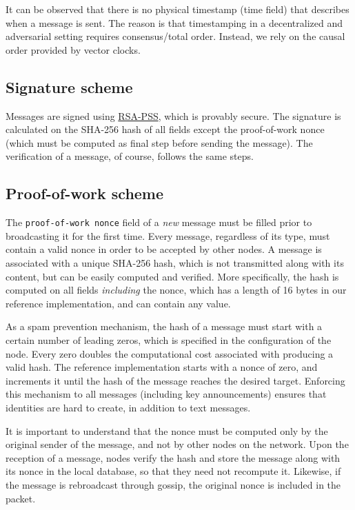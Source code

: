 \documentclass[a4paper,12pt]{article}
\begin{document}
It can be observed that there is no physical timestamp (time field) that describes when a message is sent. The reason is that timestamping in a decentralized and adversarial setting requires consensus/total order. Instead, we rely on the causal order provided by vector clocks.

\subsection*{Signature scheme}
Messages are signed using \href{https://en.wikipedia.org/wiki/Probabilistic\_signature\_scheme}{RSA-PSS}, which is provably secure. The signature is calculated on the SHA-256 hash of all fields except the proof-of-work nonce (which must be computed as final step before sending the message). The verification of a message, of course, follows the same steps.

\subsection*{Proof-of-work scheme}
The \texttt{proof-of-work nonce} field of a \emph{new} message must be filled prior to broadcasting it for the first time. Every message, regardless of its type, must contain a valid nonce in order to be accepted by other nodes.
A message is associated with a unique SHA-256 hash, which is not transmitted along with its content, but can be easily computed and verified. More specifically, the hash is computed on all fields \emph{including} the nonce, which has a length of 16 bytes in our reference implementation, and can contain any value.

As a spam prevention mechanism, the hash of a message must start with a certain number of leading zeros, which is specified in the configuration of the node. Every zero doubles the computational cost associated with producing a valid hash. The reference implementation starts with a nonce of zero, and increments it until the hash of the message reaches the desired target. Enforcing this mechanism to all messages (including key announcements) ensures that identities are hard to create, in addition to text messages.

It is important to understand that the nonce must be computed only by the original sender of the message, and not by other nodes on the network. Upon the reception of a message, nodes verify the hash and store the message along with its nonce in the local database, so that they need not recompute it. Likewise, if the message is rebroadcast through gossip, the original nonce is included in the packet.
\end{document}
